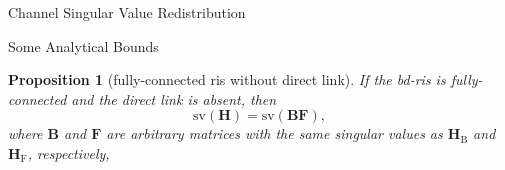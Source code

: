 \documentclass[journal]{IEEEtran}
\newtheorem{proposition}{Proposition}
\begin{document}
\begin{section}{Channel Singular Value Redistribution}
\begin{subsection}{Some Analytical Bounds}
		\begin{proposition}[fully-connected \gls{ris} without direct link]
			If the \gls{bd}-\gls{ris} is fully-connected and the direct link is absent, then
			\begin{equation}
				\mathrm{sv}(\mathbf{H}) = \mathrm{sv}(\mathbf{BF}),
			\end{equation}
			where $\mathbf{B}$ and $\mathbf{F}$ are arbitrary matrices with the same singular values as $\mathbf{H}_\mathrm{B}$ and $\mathbf{H}_\mathrm{F}$, respectively,
		\end{proposition}


\end{subsection}
\end{section}
\end{document}
